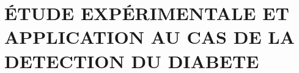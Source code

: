 \documentclass{rapportENSIAS}
\begin{document}

% 
% 
% 


\part{ÉTUDE EXPÉRIMENTALE ET APPLICATION AU CAS DE LA DETECTION DU DIABETE}







\newpage
{}
\renewcommand{\bibsection}{\chapter*{BIBLIOGRAPHIE}} %





\end{document}
